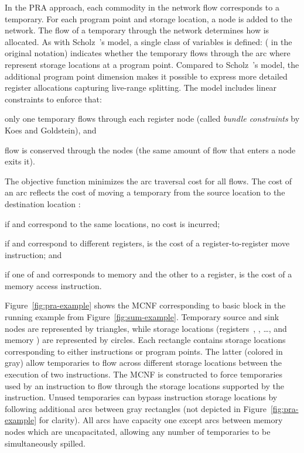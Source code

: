 \documentclass[acmsmall,authorversion,nonacm]{acmart}
\newcommand{\var}[2]{}
\begin{document}
In the PRA approach, each commodity in the network flow corresponds to
a temporary.
For each program point and storage location, a node is added to the
network.
The flow of a temporary  through the network determines how  is
allocated.
As with Scholz~\etal{}'s model, a single class of variables is
defined:
\var{a}{t,i,j} ( in the original notation) indicates
whether the temporary  flows through the arc  where
 represent storage locations at a program point.
Compared to Scholz~\etal{}'s model, the additional program point
dimension makes it possible to express more detailed register
allocations capturing live-range splitting.
The model includes linear constraints to enforce that:
\begin{inparaitem}[]
\item only one temporary flows through each register node (called
  \emph{bundle constraints} by Koes and Goldstein),
  and
\item flow is conserved through the nodes (the same amount of flow
  that enters a node exits it).
\end{inparaitem}
The objective function minimizes the arc traversal cost for all
flows.
The cost of an arc \var{c}{i,j} reflects the cost of moving a
temporary from the source location  to the destination location
:
\begin{inparaitem}[]
\item if  and  correspond to the same locations, no cost is
  incurred;
\item if  and  correspond to different registers, \var{c}{i,j}
  is the cost of a register-to-register move instruction; and
\item if one of  and  corresponds to memory and the other to a
  register, \var{c}{i,j} is the cost of a memory access instruction.
\end{inparaitem}

Figure~\ref{fig:pra-example} shows the MCNF corresponding to basic
block  in the running example from
Figure~\ref{fig:sum-example}.
Temporary source and sink nodes are represented by triangles, while
storage locations (registers~, , \ldots,
and memory ) are represented by circles.
Each rectangle contains storage locations corresponding to either
instructions or program points.
The latter (colored in gray) allow temporaries to flow across
different storage locations between the execution of two instructions.
The MCNF is constructed to force temporaries used by an instruction to
flow through the storage locations supported by the instruction.
Unused temporaries can bypass instruction storage locations by
following additional arcs between gray rectangles (not depicted in
Figure~\ref{fig:pra-example} for clarity).
All arcs have capacity one except arcs between memory nodes which are
uncapacitated, allowing any number of temporaries to be simultaneously
spilled.
\end{document}
